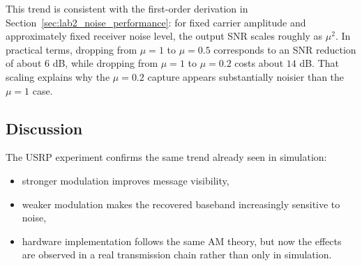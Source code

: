 This trend is consistent with the first-order derivation in
Section~\ref{sec:lab2_noise_performance}: for fixed carrier amplitude and
approximately fixed receiver noise level, the output SNR scales roughly as
$\mu^2$. In practical terms, dropping from $\mu=1$ to $\mu=0.5$ corresponds to
an SNR reduction of about $6$ dB, while dropping from $\mu=1$ to $\mu=0.2$
costs about $14$ dB. That scaling explains why the $\mu=0.2$ capture appears
substantially noisier than the $\mu=1$ case.

\subsection{Discussion}

The USRP experiment confirms the same trend already seen in simulation:
\begin{itemize}
\item stronger modulation improves message visibility,
\item weaker modulation makes the recovered baseband increasingly sensitive to
noise,
\item hardware implementation follows the same AM theory, but now the effects are
observed in a real transmission chain rather than only in simulation.
\end{itemize}
